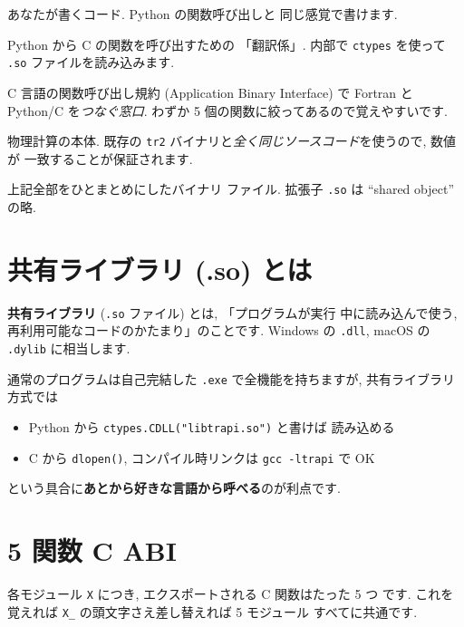 \documentclass[11pt,a4paper]{report}
\begin{document}
\begin{description}[leftmargin=1.5em]
  \item[ユーザ層] あなたが書くコード. Python の関数呼び出しと
        同じ感覚で書けます.
  \item[Python ラッパ層] Python から C の関数を呼び出すための
        「翻訳係」. 内部で \texttt{ctypes} を使って \texttt{.so}
        ファイルを読み込みます.
  \item[C ABI 層] C 言語の関数呼び出し規約 (Application Binary
        Interface) で Fortran と Python/C を\emph{つなぐ窓口}.
        わずか 5 個の関数に絞ってあるので覚えやすいです.
  \item[Fortran バックエンド] 物理計算の本体. 既存の \texttt{tr2}
        バイナリと\emph{全く同じソースコード}を使うので, 数値が
        一致することが保証されます.
  \item[共有ライブラリ] 上記全部をひとまとめにしたバイナリ
        ファイル. 拡張子 \texttt{.so} は ``shared object'' の略.
\end{description}

\section{共有ライブラリ (.so) とは}

\begin{note}
\textbf{共有ライブラリ} (\texttt{.so} ファイル) とは, 「プログラムが実行
中に読み込んで使う, 再利用可能なコードのかたまり」のことです.
Windows の \texttt{.dll}, macOS の \texttt{.dylib} に相当します.

通常のプログラムは自己完結した \texttt{.exe} で全機能を持ちますが,
共有ライブラリ方式では

\begin{itemize}
  \item Python から \texttt{ctypes.CDLL("libtrapi.so")} と書けば
        読み込める
  \item C から \texttt{dlopen()}, コンパイル時リンクは
        \texttt{gcc -ltrapi} で OK
\end{itemize}

という具合に\textbf{あとから好きな言語から呼べる}のが利点です.
\end{note}

\section{5 関数 C ABI}

各モジュール \texttt{X} につき, エクスポートされる C 関数はたった 5 つ
です. これを覚えれば \texttt{X\_} の頭文字さえ差し替えれば 5 モジュール
すべてに共通です.
\end{document}
